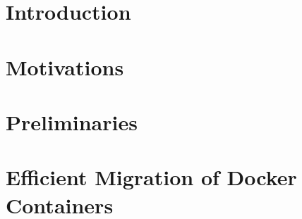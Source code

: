 \documentclass[sigconf]{acmart}
\begin{document}


\begin{abstract}

\end{abstract}





\maketitle

% 

% 

\section{Introduction}


\section{Motivations}



% 

\section{Preliminaries}



\section{Efficient  Migration of Docker Containers}



\end{document}
